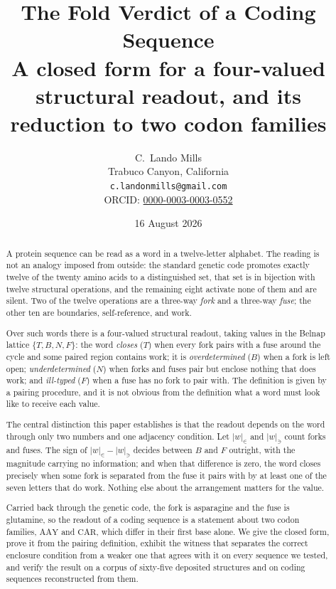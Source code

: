 \documentclass[12pt,a4paper]{article}
\begin{document}
\title{\textbf{The Fold Verdict of a Coding Sequence}\\[0.3em]
\large A closed form for a four-valued structural readout, and its reduction to two codon families}
\author{C.\ Lando Mills\\
Trabuco Canyon, California\\
\texttt{c.landonmills@gmail.com}\\
ORCID: \href{https://orcid.org/0000-0003-0003-0552}{0000-0003-0003-0552}}
\date{16 August 2026}
\maketitle

\begin{abstract}
A protein sequence can be read as a word in a twelve-letter alphabet. The reading
is not an analogy imposed from outside: the standard genetic code promotes exactly
twelve of the twenty amino acids to a distinguished set, that set is in bijection
with twelve structural operations, and the remaining eight activate none of them
and are silent. Two of the twelve operations are a three-way \emph{fork} and a
three-way \emph{fuse}; the other ten are boundaries, self-reference, and work.

Over such words there is a four-valued structural readout, taking values in the
Belnap lattice $\{T, B, N, F\}$: the word \emph{closes} ($T$) when every fork pairs
with a fuse around the cycle and some paired region contains work; it is
\emph{overdetermined} ($B$) when a fork is left open; \emph{underdetermined} ($N$)
when forks and fuses pair but enclose nothing that does work; and \emph{ill-typed}
($F$) when a fuse has no fork to pair with. The definition is given by a pairing
procedure, and it is not obvious from the definition what a word must look like to
receive each value.

The central distinction this paper establishes is that the readout depends on the
word through only two numbers and one adjacency condition. Let $|w|_{\in}$ and
$|w|_{\ni}$ count forks and fuses. The sign of $|w|_{\in} - |w|_{\ni}$ decides
between $B$ and $F$ outright, with the magnitude carrying no information; and when
that difference is zero, the word closes precisely when some fork is separated from
the fuse it pairs with by at least one of the seven letters that do work. Nothing
else about the arrangement matters for the value.

Carried back through the genetic code, the fork is asparagine and the fuse is
glutamine, so the readout of a coding sequence is a statement about two codon
families, $\mathrm{AAY}$ and $\mathrm{CAR}$, which differ in their first base
alone. We give the closed form, prove it from the pairing definition, exhibit the
witness that separates the correct enclosure condition from a weaker one that
agrees with it on every sequence we tested, and verify the result on a corpus of
sixty-five deposited structures and on coding sequences reconstructed from them.
\end{abstract}
\end{document}
